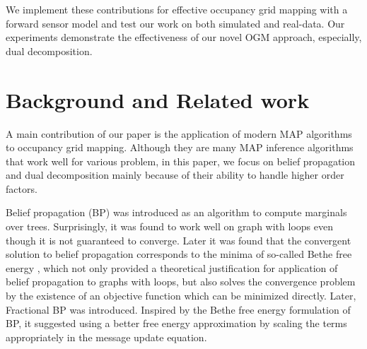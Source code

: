 \documentclass[letterpaper, 10 pt, conference]{ieeeconf} %
\begin{document}
We implement these contributions for effective occupancy grid mapping with a 
forward sensor model and test our work on both simulated and real-data. Our 
experiments demonstrate the effectiveness of our novel OGM approach, especially, 
dual decomposition.  


\section{Background and Related work} 
\label{sec:related}

%

A main contribution of our paper is the application of modern MAP algorithms to 
occupancy grid mapping. Although they are many MAP inference algorithms 
\cite{kappes2013comparative} that work well for various problem, in this paper, 
we focus on belief propagation \cite{kschischang2001factor} and dual 
decomposition \cite{sontag2011introduction} mainly because of their ability to 
handle higher order factors. %

Belief propagation (BP) \cite{pearl1986fusion} was introduced as an algorithm to 
compute marginals over trees.  Surprisingly, it was found to work well on graph 
with loops even though it is not guaranteed to converge. Later it was found 
that the convergent solution to belief propagation corresponds to the minima of 
so-called Bethe free energy \cite{yedidia2000generalized}, which not only 
provided a theoretical justification for application of belief propagation to 
graphs with loops, but also solves the convergence problem by the existence of 
an objective function which can be minimized directly.  Later, Fractional BP 
\cite{wiegerinck2003fractional} was introduced.  Inspired by the Bethe free 
energy formulation of BP, it suggested using a better free energy approximation 
by scaling the terms appropriately in the message update equation.  
\end{document}
